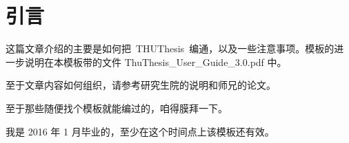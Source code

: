 
\chapter{引言}

\label{cha:intro}

这篇文章介绍的主要是如何把~THUThesis~编通，以及一些注意事项。模板的进一步说明在本模板带的文件
ThuThesis\_User\_Guide\_3.0.pdf
中。

至于文章内容如何组织，请参考研究生院的说明\cite{shuoming}和师兄的论文。

至于那些随便找个模板就能编过的，咱得膜拜一下。

我是 2016 年 1 月毕业的，至少在这个时间点上该模板还有效。


